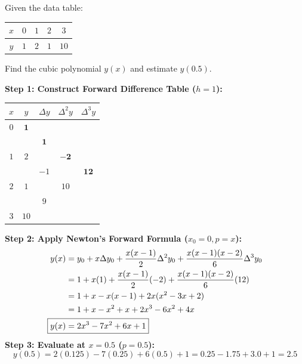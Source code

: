 \begin{examplebox}
Given the data table:
\begin{center}
\begin{tabular}{c|cccc}
$x$ & $0$ & $1$ & $2$ & $3$ \\
\hline
$y$ & $1$ & $2$ & $1$ & $10$
\end{tabular}
\end{center}
Find the cubic polynomial $y(x)$ and estimate $y(0.5)$.

\textbf{Step 1: Construct Forward Difference Table ($h = 1$):}
\begin{center}
\renewcommand{\arraystretch}{1.2}
\begin{tabular}{|c|c|c|c|c|}
\hline
$x$ & $y$ & $\Delta y$ & $\Delta^2 y$ & $\Delta^3 y$ \\
\hline
$0$ & $\mathbf{1}$ & & & \\
    &   & $\mathbf{1}$ & & \\
$1$ & $2$ & & $\mathbf{-2}$ & \\
    &   & $-1$ & & $\mathbf{12}$ \\
$2$ & $1$ & & $10$ & \\
    &   & $9$ & & \\
$3$ & $10$ & & & \\
\hline
\end{tabular}
\end{center}
\textbf{Step 2: Apply Newton's Forward Formula ($x_0 = 0, p = x$):}
\begin{align}
    y(x) &= y_0 + x \Delta y_0 + \frac{x(x-1)}{2} \Delta^2 y_0 + \frac{x(x-1)(x-2)}{6} \Delta^3 y_0 \nonumber \\
    &= 1 + x(1) + \frac{x(x-1)}{2}(-2) + \frac{x(x-1)(x-2)}{6}(12) \nonumber \\
    &= 1 + x - x(x-1) + 2x(x^2 - 3x + 2) \nonumber \\
    &= 1 + x - x^2 + x + 2x^3 - 6x^2 + 4x \nonumber \\
    \Aboxed{y(x) &= 2x^3 - 7x^2 + 6x + 1}
\end{align}
\textbf{Step 3: Evaluate at $x = 0.5$ ($p = 0.5$):}
\begin{equation}
    y(0.5) = 2(0.125) - 7(0.25) + 6(0.5) + 1 = 0.25 - 1.75 + 3.0 + 1 = \mathbf{2.5}
\end{equation}
\end{examplebox}

